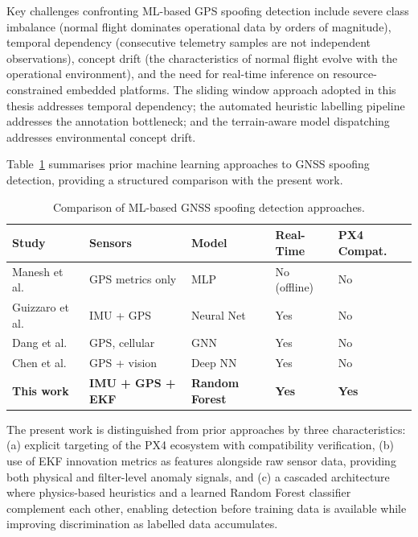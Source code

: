 Key challenges confronting ML-based GPS spoofing detection include severe class imbalance (normal flight dominates operational data by orders of magnitude), temporal dependency (consecutive telemetry samples are not independent observations), concept drift (the characteristics of normal flight evolve with the operational environment), and the need for real-time inference on resource-constrained embedded platforms. The sliding window approach adopted in this thesis addresses temporal dependency; the automated heuristic labelling pipeline addresses the annotation bottleneck; and the terrain-aware model dispatching addresses environmental concept drift.

Table~\ref{tab:ml_comparison} summarises prior machine learning approaches to GNSS spoofing detection, providing a structured comparison with the present work.

\begin{table}[H]
\centering
\caption{Comparison of ML-based GNSS spoofing detection approaches.}
\label{tab:ml_comparison}
\small
\begin{tabular}{@{}lp{2.5cm}p{1.8cm}p{1.3cm}p{1.5cm}@{}}
\toprule
\textbf{Study} & \textbf{Sensors} & \textbf{Model} & \textbf{Real-Time} & \textbf{PX4 Compat.} \\
\midrule
Manesh et al.~\cite{Manesh2019} & GPS metrics only & MLP & No (offline) & No \\
Guizzaro et al.~\cite{Guizzaro2022} & IMU + GPS & Neural Net & Yes & No \\
Dang et al.~\cite{Dang2023} & GPS, cellular & GNN & Yes & No \\
Chen et al.~\cite{Chen2023} & GPS + vision & Deep NN & Yes & No \\
\textbf{This work} & \textbf{IMU + GPS + EKF} & \textbf{Random Forest} & \textbf{Yes} & \textbf{Yes} \\
\bottomrule
\end{tabular}
\end{table}

The present work is distinguished from prior approaches by three characteristics: (a) explicit targeting of the PX4 ecosystem with compatibility verification, (b) use of EKF innovation metrics as features alongside raw sensor data, providing both physical and filter-level anomaly signals, and (c) a cascaded architecture where physics-based heuristics and a learned Random Forest classifier complement each other, enabling detection before training data is available while improving discrimination as labelled data accumulates.

